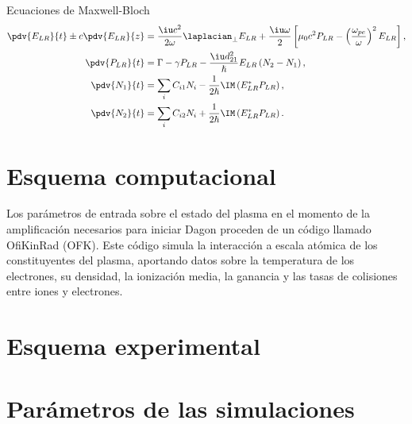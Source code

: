 \begin{footheorem*}{Ecuaciones de Maxwell-Bloch}
  \begin{align*}
    \pdv{E_{LR}}{t} \pm c \pdv{E_{LR}}{z} &= \frac{\iu c^{2}}{2 \omega}\laplacian_{\perp}E_{LR} + \frac{\iu \omega}{2} \left[\mu_{0}c^{2}P_{LR} - \left(\frac{\omega_{pe}}{\omega}\right)^{2}E_{LR}\right], \\
    \pdv{P_{LR}}{t} &= \Gamma - \gamma P_{LR} - \frac{\iu d^{2}_{21}}{\hslash }E_{LR}
    \left(N_{2}-N_{1}\right), \\
    \pdv{N_{1}}{t} &= \sum_{i} C_{i1}N_{i} - \frac{1}{2 \hslash }\IM \left(E_{LR}^{*}P_{LR}\right), \\
    \pdv{N_{2}}{t} &= \sum_{i} C_{i2}N_{i} + \frac{1}{2 \hslash }\IM \left(E_{LR}^{*}P_{LR}\right).
  \end{align*}
\end{footheorem*}

\section{Esquema computacional}\label{sec:3.2}
Los parámetros de entrada sobre el estado del plasma en el momento de la amplificación necesarios para iniciar Dagon proceden de un código llamado OfiKinRad (OFK). Este código simula la interacción a escala atómica de los constituyentes del plasma, aportando datos sobre la temperatura de los electrones, su densidad, la ionización media, la ganancia y las tasas de colisiones entre iones y electrones.

\section{Esquema experimental}\label{sec:3.3}

\section{Parámetros de las simulaciones}\label{sec:3.4}
